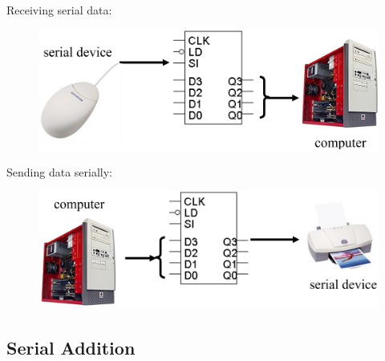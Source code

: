 \noindent Receiving serial data:
\begin{figure}[H]
  \centering
  \includegraphics[width=\linewidth]{img/receiving-serial-data.png}
\end{figure}
\noindent Sending data serially:
\begin{figure}[H]
  \centering
  \includegraphics[width=\linewidth]{img/sending-data-serially.png}
\end{figure}

\subsection{Serial Addition}
\label{subsec:serial-addition}

